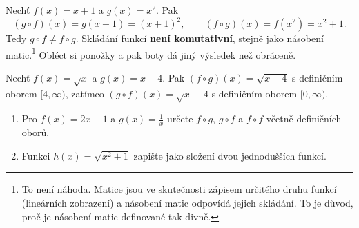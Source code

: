 \begin{center}
\end{center}

\begin{example}
  Nechť $f(x) = x + 1$ a $g(x) = x^2$. Pak
  \begin{equation*}
    (g\circ f)(x) = g(x + 1) = {(x + 1)}^2,\qquad (f\circ g)(x) = f(x^2) = x^2 + 1.
  \end{equation*}
  Tedy $g\circ f\neq f\circ g$. Skládání funkcí \textbf{není komutativní}, stejně jako násobení matic.\footnote{To není náhoda. Matice jsou ve skutečnosti zápisem určitého druhu funkcí (lineárních zobrazení) a násobení matic odpovídá jejich skládání. To je důvod, proč je násobení matic definované tak divně.} Obléct si ponožky a pak boty dá jiný výsledek než obráceně.
\end{example}

\begin{example}
  Nechť $f(x) = \sqrt{x}$ a $g(x) = x - 4$. Pak $(f\circ g)(x) = \sqrt{x - 4}$ s definičním oborem $[4, \infty)$, zatímco $(g\circ f)(x) = \sqrt{x} - 4$ s definičním oborem $[0, \infty)$.
\end{example}

\begin{problem}
  \begin{enumerate}[label=(\alph*)]
    \item Pro $f(x) = 2x - 1$ a $g(x) = \frac{1}{x}$ určete $f\circ g$, $g\circ f$ a $f\circ f$ včetně definičních oborů.
    \item Funkci $h(x) = \sqrt{x^2 + 1}$ zapište jako složení dvou jednodušších funkcí.
  \end{enumerate}
\end{problem}

